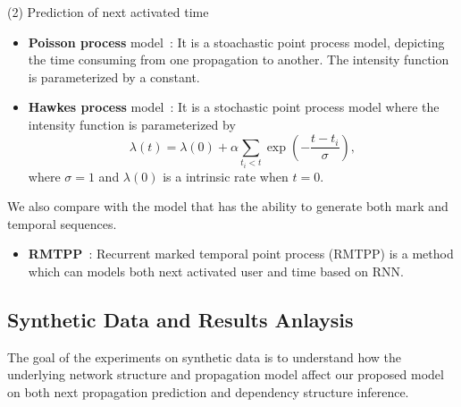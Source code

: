 (2) Prediction of next activated time 
\begin{itemize}
  \item \textbf{Poisson process} model~\cite{vere1988introduction}: It is a
  stoachastic point process model, depicting the time consuming from one
  propagation to another. The intensity function is parameterized by a constant.
  \item \textbf{Hawkes process} model~\cite{hawkes1971spectra}: It is a
  stochastic point process model where the intensity function is parameterized by
  \begin{equation} 
  \label{eq:hawke_intens_func}
  \lambda(t)=\lambda(0)+\alpha\sum_{t_i<t}\exp\left(-\frac{t-t_i}{\sigma}\right),
  \end{equation}
  where $\sigma=1$ and $\lambda(0)$ is a intrinsic rate when $t=0$.
\end{itemize}

We also compare with the model that has the ability to generate both mark and
temporal sequences.
\begin{itemize}
  \item \textbf{RMTPP}~\cite{DuKDD2016}: Recurrent marked temporal point process
  (RMTPP) is a method which can models both next activated user and time based on RNN.
\end{itemize}

\subsection{Synthetic Data and Results Anlaysis}
The goal of the experiments on synthetic
data is to understand how the underlying network structure and propagation
model affect our proposed model on both next propagation prediction and
dependency structure inference. 

